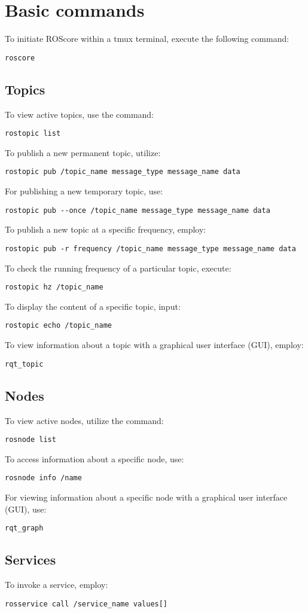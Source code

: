 \section{Basic commands}

To initiate ROScore within a tmux terminal, execute the following command: 
\begin{verbatim}
roscore
\end{verbatim}

\subsection{Topics}
To view active topics, use the command:
\begin{verbatim}
rostopic list
\end{verbatim}
To publish a new permanent topic, utilize:
\begin{verbatim}
rostopic pub /topic_name message_type message_name data
\end{verbatim}
For publishing a new temporary topic, use:
\begin{verbatim}
rostopic pub --once /topic_name message_type message_name data
\end{verbatim}
To publish a new topic at a specific frequency, employ:
\begin{verbatim}
rostopic pub -r frequency /topic_name message_type message_name data
\end{verbatim}
To check the running frequency of a particular topic, execute:
\begin{verbatim}
rostopic hz /topic_name
\end{verbatim}
To display the content of a specific topic, input:
\begin{verbatim}
rostopic echo /topic_name
\end{verbatim}
To view information about a topic with a graphical user interface (GUI), employ:
\begin{verbatim}
rqt_topic
\end{verbatim}

\subsection{Nodes}
To view active nodes, utilize the command:
\begin{verbatim}
rosnode list
\end{verbatim}
To access information about a specific node, use:
\begin{verbatim}
rosnode info /name
\end{verbatim}
For viewing information about a specific node with a graphical user interface (GUI), use:
\begin{verbatim}
rqt_graph
\end{verbatim}

\subsection{Services}
To invoke a service, employ:
\begin{verbatim}
rosservice call /service_name values[]
\end{verbatim}
